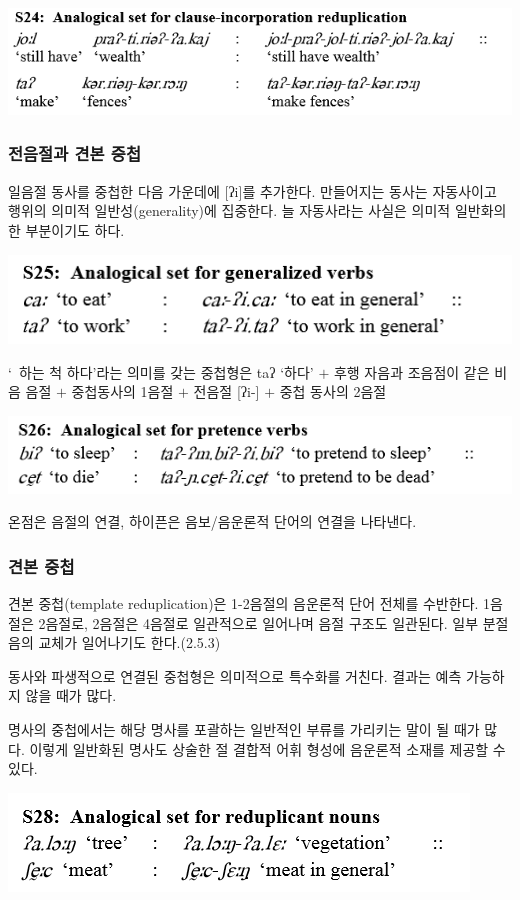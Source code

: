 \includegraphics{Pacoh/src/PacohS24.png}

\subsubsection{전음절과 견본 중첩}
일음절 동사를 중첩한 다음 가운데에 [ʔi]를 추가한다. 만들어지는 동사는 자동사이고 행위의 의미적 일반성(generality)에 집중한다. 늘 자동사라는 사실은 의미적 일반화의 한 부분이기도 하다.

\includegraphics{Pacoh/src/PacohS25.png}

`~하는 척 하다'라는 의미를 갖는 중첩형은 taʔ `하다' $+$ 후행 자음과 조음점이 같은 비음 음절 $+$ 중첩동사의 1음절 $+$ 전음절 [ʔi-] $+$ 중첩 동사의 2음절

\includegraphics{Pacoh/src/PacohS26.png}

온점은 음절의 연결, 하이픈은 음보/음운론적 단어의 연결을 나타낸다.

\subsubsection{견본 중첩}
견본 중첩(template reduplication)은 1-2음절의 음운론적 단어 전체를 수반한다. 1음절은 2음절로, 2음절은 4음절로 일관적으로 일어나며
음절 구조도 일관된다. 일부 분절음의 교체가 일어나기도 한다.(2.5.3)

동사와 파생적으로 연결된 중첩형은 의미적으로 특수화를 거친다. 결과는 예측 가능하지 않을 때가 많다. 

명사의 중첩에서는 해당 명사를 포괄하는 일반적인 부류를 가리키는 말이 될 때가 많다. 이렇게 일반화된 명사도 상술한 절 결합적 어휘 형성에 음운론적 소재를 제공할 수 있다.

\includegraphics{Pacoh/src/PacohS28.png}

